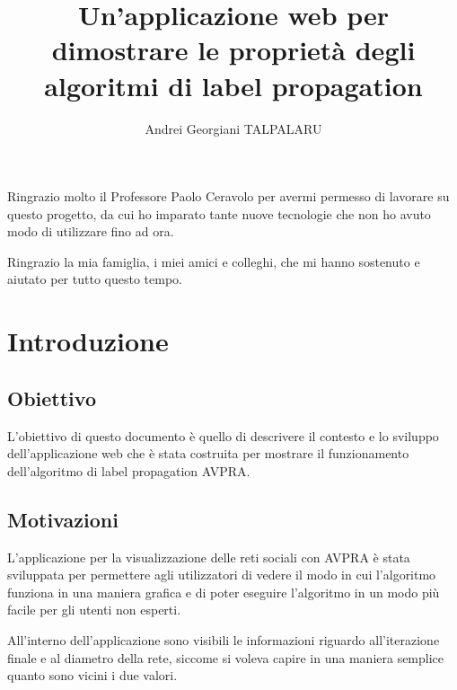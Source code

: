 \documentclass[a4paper,12pt]{report}
\begin{document}

\setcounter{secnumdepth}{5}
\setcounter{tocdepth}{5}

\title{Un'applicazione web per dimostrare le proprietà degli algoritmi di label propagation}
\author{Andrei Georgiani TALPALARU}

\beforepreface
{}
Ringrazio molto il Professore Paolo Ceravolo per avermi permesso di lavorare su questo progetto, da cui ho imparato tante nuove tecnologie che non ho avuto modo di utilizzare fino ad ora. 

Ringrazio la mia famiglia, i miei amici e colleghi, che mi hanno sostenuto e aiutato per tutto questo tempo.
\afterpreface
% 
% 
%		
\chapter{Introduzione}

\section{Obiettivo}
L'obiettivo di questo documento è quello di descrivere il contesto e lo sviluppo dell'applicazione web che è stata costruita per mostrare il funzionamento dell'algoritmo di label propagation AVPRA.

\section{Motivazioni}
L'applicazione per la visualizzazione delle reti sociali con AVPRA è stata sviluppata per permettere agli utilizzatori di vedere il modo in cui l'algoritmo funziona in una maniera grafica e di poter eseguire l'algoritmo in un modo più facile per gli utenti non esperti.

All'interno dell'applicazione sono visibili le informazioni riguardo all'iterazione finale e al diametro della rete, siccome si voleva capire in una maniera semplice quanto sono vicini i due valori.

\pagebreak
\end{document}
